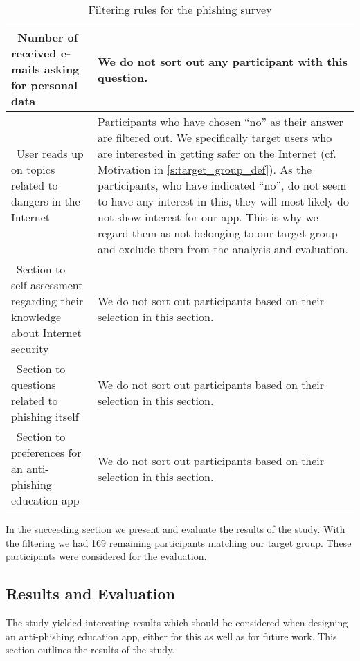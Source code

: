 \begin{table}[hHtbp]
\begin{tabular}{ | p{4.5cm} | p{10cm} |}
 \\
    \hline\ Number of received e-mails asking for personal data  & We do not sort out any participant with this question.
 \\
    \hline\ User reads up on topics related to dangers in the Internet  &  Participants who have chosen ``no'' as their answer are filtered out.
 We specifically target users who are interested in getting safer on the Internet (cf. Motivation in \autoref{s:target_group_def}).
 As the participants, who have indicated ``no'', do not seem to have any interest in this, they will most likely do not show interest for our app.
This is why we regard them as not belonging to our target group and exclude them from the analysis and evaluation.
\\
    \hline\  Section to self-assessment regarding their knowledge about Internet security &  We do not sort out participants based on their selection in this section.
\\
		\hline\  Section to questions related to phishing itself & We do not sort out participants based on their selection in this section.
 \\
    \hline\  Section to preferences for an anti-phishing education app & We do not sort out participants based on their selection in this section.
\\
    \hline
    \end{tabular}
    \caption{Filtering rules for the phishing survey}
    \label{table:prestudy_filter}
    
\end{table}

In the succeeding section we present and evaluate the results of the study.
 With the filtering we had 169 remaining participants matching our target group.
These participants were considered for the evaluation.

\subsection{Results and Evaluation}
\label{s:survey_results}
The study yielded interesting results which should be considered when designing an anti-phishing education app, either for this as well as for future work.
 This section outlines the results of the study.

